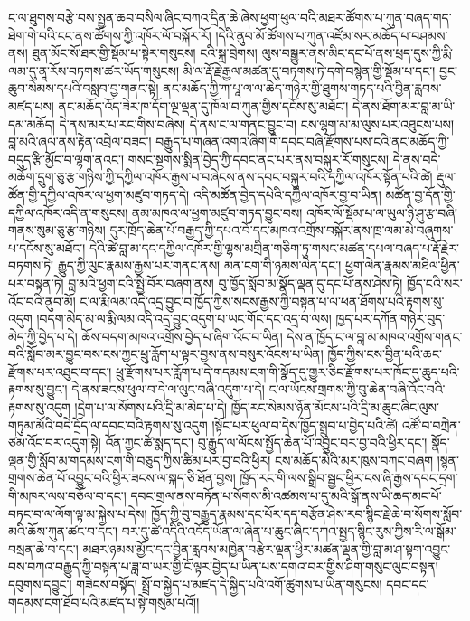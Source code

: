 \documentclass{article}
\begin{document}
ང་ལ་ཐུགས་བརྩེ་བས་སྤྱན་ཆབ་བསིལ་ཞིང་བཀའ་དྲིན་ཆེ་ཞེས་ཕྱག་ཕུལ་བའི་མཐར་ཚོགས་པ་ཀུན་བཞད་གད་ཐེག་གེ་བའི་ངང་ནས་ཚོགས་ཀྱི་འཁོར་ལོ་བསྐོར་རོ། །དེའི་ནུབ་མོ་ཚོགས་པ་ཀུན་འཛོམ་སར་མཆོད་པ་བཤམས་ནས། ཐུན་མོང་སོ་ཐར་གྱི་སྡོམ་པ་སྟེར་གསུངས། ངའི་སྐྲ་བྲེགས། ལུས་བསྒྱུར་ནས་མིང་དང་པོ་ནས་ཕྲད་དུས་ཀྱི་རྨི་ལམ་དུ་ནཱ་རོས་བཏགས་ཚར་ཡོད་གསུངས། མི་ལ་རྡོ་རྗེ་རྒྱལ་མཚན་དུ་བཏགས་ཏེ་དགེ་བསྙེན་གྱི་སྡོམ་པ་དང་། བྱང་ཆུབ་སེམས་དཔའི་བསླབ་བྱ་གནང་སྟེ། ནང་མཆོད་ཀྱི་ཀ་པཱ་ལ་ལ་ཆེད་གཉེར་གྱི་ཐུགས་གཏད་པའི་བྱིན་རླབས་མཛད་པས། ནང་མཆོད་འོད་ཟེར་ཁ་དོག་ལྔ་ལྡན་དུ་ཁོལ་བ་ཀུན་གྱིས་དངོས་སུ་མཐོང་། དེ་ནས་ཐོག་མར་བླ་མ་ཡི་དམ་མཆོད། དེ་ནས་མར་པ་རང་གིས་བཞེས། དེ་ནས་ང་ལ་གནང་བྱུང་བ། ངས་ལྷག་མ་མ་ལུས་པར་འཐུངས་པས། བླ་མའི་ཞལ་ནས་རྟེན་འབྲེལ་བཟང་། བརྒྱུད་པ་གཞན་འགའ་ཞིག་གི་དབང་བཞི་རྫོགས་པས་ངའི་ནང་མཆོད་ཀྱི་བདུད་རྩི་མྱོང་བ་ལྷག་ནའང་། གསང་སྔགས་སྨིན་བྱེད་ཀྱི་དབང་ནང་པར་ནས་བསྐུར་རོ་གསུངས། དེ་ནས་བདེ་མཆོག་དྲུག་ཅུ་རྩ་གཉིས་ཀྱི་དཀྱིལ་འཁོར་རྒྱས་པ་བཞེངས་ནས་དབང་བསྐུར་བའི་དཀྱིལ་འཁོར་སྟོན་པའི་ཚེ། རྡུལ་ཚོན་གྱི་དཀྱིལ་འཁོར་ལ་ཕྱག་མཛུབ་གཏད་དེ། འདི་མཚོན་བྱེད་དཔེའི་དཀྱིལ་འཁོར་བྱ་བ་ཡིན། མཚོན་བྱ་དོན་གྱི་དཀྱིལ་འཁོར་འདི་ན་གསུངས། ནམ་མཁའ་ལ་ཕྱག་མཛུབ་གཏད་བྱུང་བས། འཁོར་ལོ་སྡོམ་པ་ལ་ཡུལ་ཉི་ཤུ་རྩ་བཞི། གནས་སུམ་ཅུ་རྩ་གཉིས། དུར་ཁྲོད་ཆེན་པོ་བརྒྱད་ཀྱི་དཔའ་བོ་དང་མཁའ་འགྲོས་བསྐོར་ནས་ཁྲ་ལམ་མེ་བཞུགས་པ་དངོས་སུ་མཐོང་། དེའི་ཚེ་བླ་མ་དང་དཀྱིལ་འཁོར་གྱི་ལྷས་མགྲིན་གཅིག་ཏུ་གསང་མཚན་དཔལ་བཞད་པ་རྡོ་རྗེར་བཏགས་ཏེ། རྒྱུད་ཀྱི་ལུང་རྣམས་རྒྱས་པར་གནང་ནས། མན་ངག་གི་ཉམས་ལེན་དང་། ཕྱག་ལེན་རྣམས་མཐིལ་ཕྱིན་པར་བསྟན་ཏེ། བླ་མའི་ཕྱག་ངའི་སྤྱི་བོར་བཞག་ནས། བུ་ཁྱོད་སློབ་མ་སྣོད་ལྡན་དུ་དང་པོ་ནས་ཤེས་ཏེ། ཁྱོད་ངའི་སར་འོང་བའི་ནུབ་མོ། ང་ལ་རྨི་ལམ་འདི་འདྲ་བྱུང་བ་ཁྱོད་ཀྱིས་སངས་རྒྱས་ཀྱི་བསྟན་པ་ལ་ཕན་ཐོགས་པའི་རྟགས་སུ་འདུག །བདག་མེད་མ་ལ་རྨི་ལམ་འདི་འདྲ་བྱུང་འདུག་པ་ཡང་གོང་དང་འདྲ་བ་ལས། ཁྱད་པར་དཀོན་གཉེར་བུད་མེད་ཀྱི་བྱེད་པ་དེ། ཆོས་བདག་མཁའ་འགྲོས་བྱེད་པ་ཞིག་འོང་བ་ཡིན། དེས་ན་ཁྱོད་ང་ལ་བླ་མ་མཁའ་འགྲོས་གནང་བའི་སློབ་མར་བྱུང་བས་ངས་ཀྱང་ཕྲུ་རློག་པ་ལྟར་བྱས་ནས་བསུར་འོངས་པ་ཡིན། ཁྱོད་ཀྱིས་ངས་བྱིན་པའི་ཆང་རྫོགས་པར་འཐུང་བ་དང་། ཕྲུ་རྫོགས་པར་རློག་པ་དེ་གདམས་ངག་གི་སྣོད་དུ་གྱུར་ཅིང་རྫོགས་པར་ཁོང་དུ་ཆུད་པའི་རྟགས་སུ་བྱུང་། དེ་ནས་ཟངས་ཕུལ་བ་དེ་ལ་ལུང་བཞི་འདུག་པ་དེ། ང་ལ་ཡོངས་གྲགས་ཀྱི་བུ་ཆེན་བཞི་འོང་བའི་རྟགས་སུ་འདུག །དྲེག་པ་ལ་སོགས་པའི་དྲི་མ་མེད་པ་དེ། ཁྱོད་རང་སེམས་ཉོན་མོངས་པའི་དྲི་མ་ཆུང་ཞིང་ལུས་གཏུམ་མོའི་བདེ་དྲོད་ལ་དབང་བའི་རྟགས་སུ་འདུག །སྟོང་པར་ཕུལ་བ་དེས་ཁྱོད་སྒྲུབ་པ་བྱེད་པའི་ཚེ། འཚོ་བ་བཀྲེན་ཙམ་འོང་བར་འདུག་སྟེ། འོན་ཀྱང་ཚེ་སྨད་དང་། བུ་རྒྱུད་ལ་ལོངས་སྤྱོད་ཆེན་པོ་འབྱུང་བར་བྱ་བའི་ཕྱིར་དང་། སྣོད་ལྡན་གྱི་སློབ་མ་གདམས་ངག་གི་བཅུད་ཀྱིས་ཚིམ་པར་བྱ་བའི་ཕྱིར། ངས་མཆོད་མེའི་མར་ཁུས་བཀང་བཞག །སྙན་གྲགས་ཆེན་པོ་འབྱུང་བའི་ཕྱིར་ཟངས་ལ་སྐད་ཅི་ཐོན་བྱས། ཁྱོད་རང་གི་ལས་སྒྲིབ་སྦྱང་ཕྱིར་ངས་ཞི་རྒྱས་དབང་དྲག་གི་མཁར་ལས་བཅོལ་བ་དང་། དབང་གྲལ་ནས་བཏོན་པ་སོགས་མི་འཚམས་པ་དུ་མའི་སྒོ་ནས་ཡི་ཆད་མང་པོ་བཏང་བ་ལ་ལོག་ལྟ་མ་སྐྱེས་པ་དེས། ཁྱོད་ཀྱི་བུ་བརྒྱུད་རྣམས་དང་པོར་དད་བརྩོན་ཤེས་རབ་སྙིང་རྗེ་ཆེ་བ་སོགས་སློབ་མའི་ཆོས་ཀུན་ཚང་བ་དང་། བར་དུ་ཚེ་འདིའི་འདོད་ཡོན་ལ་ཞེན་པ་ཆུང་ཞིང་དཀའ་སྤྱད་སྙིང་རུས་ཀྱིས་རི་ལ་སྒོམ་བསྲན་ཆེ་བ་དང་། མཐར་ཉམས་མྱོང་དང་བྱིན་རླབས་མཁྱེན་བརྩེར་ལྡན་ཕྱིར་མཚན་ལྡན་གྱི་བླ་མ་ཤ་སྟག་འབྱུང་བས་བཀའ་བརྒྱུད་ཀྱི་བསྟན་པ་ཟླ་བ་ཡར་གྱི་ངོ་ལྟར་བྱེད་པ་ཡིན་པས་དགའ་བར་གྱིས་ཤིག་གསུང་ལུང་བསྟན། དབུགས་དབྱུང་། གཟེངས་བསྟོད། སྤྲོ་བ་སྐྱེད་པ་མཛད་དེ་སྐྱིད་པའི་འགོ་ཚུགས་པ་ཡིན་གསུངས། དབང་དང་གདམས་ངག་ཐོབ་པའི་མཛད་པ་སྟེ་གསུམ་པའོ།།
\end{document}
